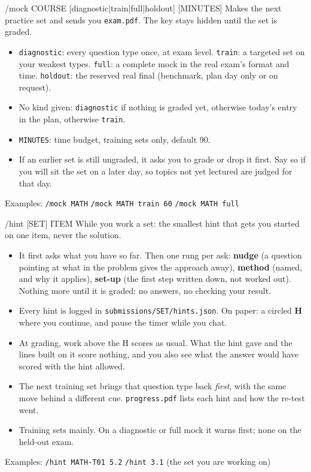 \documentclass[a4paper,10pt]{article}
\newcommand{\argx}[1]{\texttt{\color{accent}#1}}
\begin{document}
\begin{card}{/mock COURSE [diagnostic|train|full|holdout] [MINUTES]}
Makes the next practice set and sends you \texttt{exam.pdf}. The key stays hidden until the set is graded.
\begin{itemize}
  \item \argx{diagnostic}: every question type once, at exam level. \argx{train}: a targeted
    set on your weakest types. \argx{full}: a complete mock in the real exam's format and
    time. \argx{holdout}: the reserved real final (benchmark, plan day only or on request).
  \item No kind given: \texttt{diagnostic} if nothing is graded yet, otherwise today's
    entry in the plan, otherwise \texttt{train}.
  \item \argx{MINUTES}: time budget, training sets only, default 90.
  \item If an earlier set is still ungraded, it asks you to grade or drop it first.
    Say so if you will sit the set on a later day, so topics not yet lectured are judged for that day.
\end{itemize}
{\small\color{muted} Examples: \texttt{/mock MATH} \quad \texttt{/mock MATH train 60} \quad \texttt{/mock MATH full}}
\end{card}

\begin{card}{/hint [SET] ITEM}
While you work a set: the smallest hint that gets you started on one item, never the solution.
\begin{itemize}
  \item It first asks what you have so far. Then one rung per ask: \textbf{nudge} (a question pointing
    at what in the problem gives the approach away), \textbf{method} (named, and why it applies),
    \textbf{set-up} (the first step written down, not worked out). Nothing more until it is graded: no
    answers, no checking your result.
  \item Every hint is logged in \texttt{submissions/SET/hints.json}. On paper: a circled \textbf{H}
    where you continue, and pause the timer while you chat.
  \item At grading, work above the H scores as usual. What the hint gave and the lines built on it score
    nothing, and you also see what the answer would have scored with the hint allowed.
  \item The next training set brings that question type back \emph{first}, with the same move behind a
    different cue. \texttt{progress.pdf} lists each hint and how the re-test went.
  \item Training sets mainly. On a diagnostic or full mock it warns first; none on the held-out exam.
\end{itemize}
{\small\color{muted} Examples: \texttt{/hint MATH-T01 5.2} \quad \texttt{/hint 3.1} (the set you are working on)}
\end{card}
\end{document}
